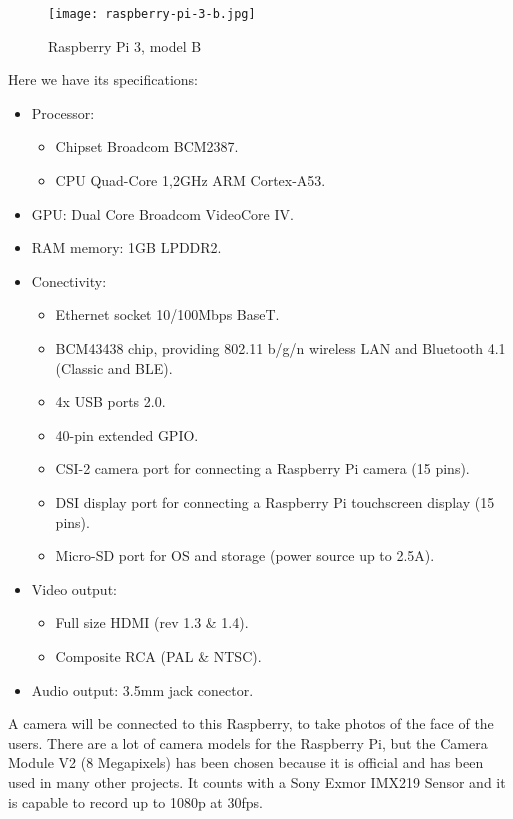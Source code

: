 	\begin{figure}[ht]
		\centering
		\texttt{[image: raspberry-pi-3-b.jpg]}
		\caption{Raspberry Pi 3, model B}
	\end{figure}

	Here we have its specifications:

	\begin{itemize}
		\item Processor:
			\begin{itemize}
				\item Chipset Broadcom BCM2387.
				\item CPU Quad-Core 1,2GHz ARM Cortex-A53.
			\end{itemize}
		\item GPU: Dual Core Broadcom VideoCore IV.
		\item RAM memory: 1GB LPDDR2.
		\item Conectivity:
			\begin{itemize}
				\item Ethernet socket 10/100Mbps BaseT.
				\item BCM43438 chip, providing 802.11 b/g/n wireless LAN and Bluetooth 4.1 (Classic and BLE).
				\item 4x USB ports 2.0.
				\item 40-pin extended GPIO.
				\item CSI-2 camera port for connecting a Raspberry Pi camera (15 pins).
				\item DSI display port for connecting a Raspberry Pi touchscreen display (15 pins).
				\item Micro-SD port for OS and storage (power source up to 2.5A).
			\end{itemize}
		\item Video output:
			\begin{itemize}
				\item Full size HDMI (rev 1.3 \& 1.4).
				\item Composite RCA (PAL \& NTSC).
			\end{itemize}
		\item Audio output: 3.5mm jack conector.
	\end{itemize}

	A camera will be connected to this Raspberry, to take photos of the face of the users. There are a lot of camera models for the Raspberry Pi, but the Camera Module V2 (8 Megapixels) has been chosen because it is official and has been used in many other projects. It counts with a Sony Exmor IMX219 Sensor and it is capable to record up to 1080p at 30fps.

